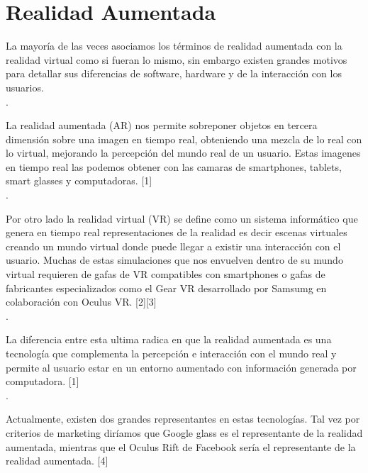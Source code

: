 \section{Realidad Aumentada}

La mayoría de las veces asociamos los términos de realidad aumentada con la realidad virtual como si fueran lo mismo, sin embargo existen grandes motivos para detallar sus diferencias de software, hardware y de la interacción con los usuarios. \\.\par 

La realidad aumentada (AR) nos permite sobreponer objetos en tercera dimensión sobre una imagen en tiempo real, obteniendo una mezcla de lo real con lo virtual, mejorando la percepción del mundo real de un usuario. Estas imagenes en tiempo real las podemos obtener con las camaras de smartphones, tablets, smart glasses y computadoras. [1] \\. \par

Por otro lado la realidad virtual (VR) se define como un sistema informático que genera en tiempo real representaciones de la realidad es decir escenas virtuales creando un mundo virtual donde puede llegar a existir una interacción con el usuario. Muchas de estas simulaciones que nos envuelven dentro de su mundo virtual requieren de gafas de VR compatibles con smartphones o gafas de fabricantes especializados como el Gear VR desarrollado por Samsumg en colaboración con Oculus VR. [2][3] \\. \par

La diferencia entre esta ultima radica en que la realidad aumentada es una tecnología que complementa  la percepción  e interacción  con el mundo real y permite al usuario estar en un entorno aumentado con información generada por computadora. [1] \\. \par

Actualmente, existen dos grandes representantes en estas tecnologías. Tal vez por criterios de marketing diríamos que Google glass es el representante de la realidad aumentada, mientras que el Oculus Rift de Facebook sería el representante de la realidad aumentada. [4]
\newline